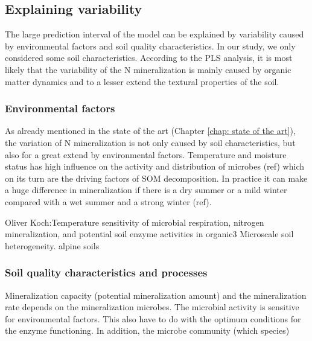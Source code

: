 \documentclass[10pt,twoside,dutch,english]{report}
\begin{document}




\subsection{Explaining variability}
The large prediction interval of the model can be explained by variability caused by environmental factors and soil quality characteristics. In our study, we only considered some soil characteristics. According to the PLS analysis, it is most likely that the variability of the N mineralization is mainly caused by organic matter dynamics and to a lesser extend the textural properties of the soil. 
\subsubsection{Environmental factors}
    As already mentioned in the state of the art (Chapter \ref{chap: state of the art}), the variation of N mineralization is not only caused by soil characteristics, but also for a great extend by environmental factors. Temperature and moisture status has high influence on the activity and distribution of microbes (ref) which on its turn are the driving factors of SOM decomposition. 
In practice it can make a huge difference in mineralization if there is a dry summer or a mild winter compared with a wet summer and a strong winter (ref). 

Oliver Koch:Temperature sensitivity of microbial respiration, nitrogen
mineralization, and potential soil enzyme activities in organic3
Microscale soil heterogeneity. 
alpine soils
\subsubsection{Soil quality characteristics and processes}
Mineralization capacity (potential mineralization amount) and  the mineralization rate depends on the mineralization microbes. The microbial activity is sensitive for environmental factors. This also have to do with the optimum conditions for the enzyme functioning. In addition, the microbe community (which species) 
                            
\end{document}
